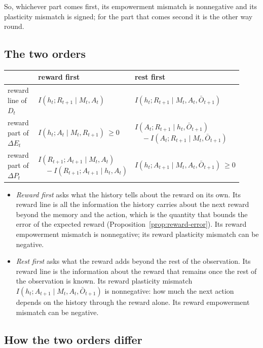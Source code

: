 \documentclass{article}
\theoremstyle{definition}
\theoremstyle{remark}
\newcommand{\dE}{\Delta E}
\newcommand{\dP}{\Delta P}
\newcommand{\Ob}{\bar O}
\begin{document}
So, whichever part comes first, its empowerment mismatch is nonnegative and its plasticity mismatch is signed; for the part that comes second it is the other way round.

\subsection{The two orders}

\begin{center}
\footnotesize
\begin{tabular}{p{0.16\linewidth}p{0.36\linewidth}p{0.4\linewidth}}
\toprule
 & reward first & rest first\\
\midrule
reward line of $D_t$ & $I(h_t;R_{t+1}\mid M_t,A_t)$ & $I(h_t;R_{t+1}\mid M_t,A_t,\Ob_{t+1})$\\[3pt]
reward part of $\dE_t$ & $I(h_t;A_t\mid M_t,R_{t+1})\ \ge0$ & $I(A_t;R_{t+1}\mid h_t,\Ob_{t+1})$\newline $\quad-I(A_t;R_{t+1}\mid M_t,\Ob_{t+1})$\\[3pt]
reward part of $\dP_t$ & $I(R_{t+1};A_{t+1}\mid M_t,A_t)$\newline $\quad-I(R_{t+1};A_{t+1}\mid h_t,A_t)$ & $I(h_t;A_{t+1}\mid M_t,A_t,\Ob_{t+1})\ \ge0$\\
\bottomrule
\end{tabular}
\end{center}

\begin{itemize}
\item \emph{Reward first} asks what the history tells about the reward on its own. Its reward line is all the information the history carries about the next reward beyond the memory and the action, which is the quantity that bounds the error of the expected reward (Proposition~\ref{prop:reward-error}). Its reward empowerment mismatch is nonnegative; its reward plasticity mismatch can be negative.
\item \emph{Rest first} asks what the reward adds beyond the rest of the observation. Its reward line is the information about the reward that remains once the rest of the observation is known. Its reward plasticity mismatch $I(h_t;A_{t+1}\mid M_t,A_t,\Ob_{t+1})$ is nonnegative: how much the next action depends on the history through the reward alone. Its reward empowerment mismatch can be negative.
\end{itemize}

\subsection{How the two orders differ}\label{sec:orders}
\end{document}
